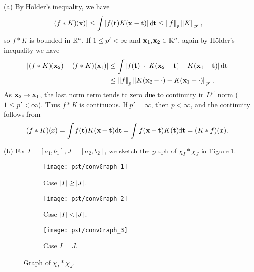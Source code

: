 \begin{exercise}{9.3}
  (a) By H\"{o}lder's inequality, we have
  \[
    \left| (f*K)(\mathbf{x}) \right|
    \le \int \left| f(\mathbf{t}) K(\mathbf{x} - \mathbf{t}) \right| \mathrm{d} \mathbf{t}
    \le \left\| f \right\|_p \left\| K \right\|_{p'},
  \]
  so $f*K$ is bounded in $\mathbb{R}^n$.
  If $1\le p' < \infty$ and $\mathbf{x}_1, \mathbf{x}_2 \in \mathbb{R}^n$,
  again by H\"{o}lder's inequality we have
  \[
    \begin{aligned}
      \left| (f*K)(\mathbf{x}_2) - (f*K)(\mathbf{x}_1) \right|
      &\le \int \left| f(\mathbf{t}) \right| \cdot
      \left| K(\mathbf{x}_2 - \mathbf{t}) - K(\mathbf{x}_1 - \mathbf{t})\right|
      \mathrm{d} \mathbf{t} \\
      &\le \left\| f \right\|_p
      \left\| K(\mathbf{x}_2 - \cdot) - K(\mathbf{x}_1 - \cdot) \right\|_{p'}.
    \end{aligned}
  \]
  As $\mathbf{x}_2 \rightarrow \mathbf{x}_1$,
  the last norm term tends to zero
  due to continuity in $L^{p'}$ norm ($1 \le p' < \infty$).
  Thus  $f*K$ is continuous.
  If $p' = \infty$, then $p < \infty$,
  and the continuity follows from
  \[
    (f*K)(x) = \int f(\mathbf{t}) K(\mathbf{x} - \mathbf{t}) \mathrm{d} \mathbf{t}
    = \int f(\mathbf{x} - \mathbf{t}) K(\mathbf{t}) \mathrm{d} \mathbf{t}
    = (K*f)(x).
  \]

  (b)
  For $I = [a_1, b_1], J = [a_2, b_2]$,
  we sketch the graph of $\chi_I * \chi_J$ in Figure \ref{fig:graphOfChiIChiJ}.
  \begin{figure}[htbp]
    \centering
    \begin{subfigure}[b]{.4\linewidth}
      \texttt{[image: pst/convGraph\_1]}
      \caption{Case $\left\vert I\right\vert \ge \left\vert J\right\vert$. }
    \end{subfigure}
    \begin{subfigure}[b]{.4\linewidth}
      \texttt{[image: pst/convGraph\_2]}
      \caption{Case $\left\vert I\right\vert < \left\vert J\right\vert$. }
    \end{subfigure}%

    \begin{subfigure}[b]{.4\linewidth}
      \texttt{[image: pst/convGraph\_3]}
      \caption{Case $I = J$. }
    \end{subfigure}%
    \caption{Graph of $\chi_I * \chi_J$. }
    \label{fig:graphOfChiIChiJ}
  \end{figure}
\end{exercise}
